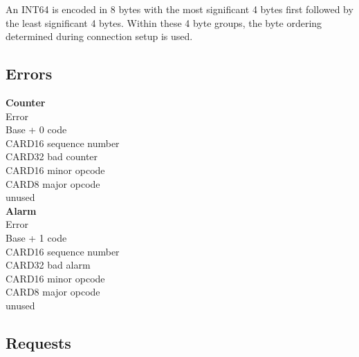 An INT64 is encoded in 8 bytes with the most significant 4 bytes
first followed by the least significant 4 bytes.  Within these
4 byte groups, the byte ordering determined during connection setup
is used.

\subsection*{Errors}

\begin{tabbing}
\tabstopsC
{\bf Counter}\\
				\> Error \\
		\> Base + 0	\> code \\
		\> CARD16	\> sequence number \\
		\> CARD32	\> bad counter \\
		\> CARD16	\> minor opcode \\
		\> CARD8	\> major opcode \\
		\>		\> unused \\
{\bf Alarm}\\
				\> Error \\
		\> Base + 1	\> code \\
		\> CARD16	\> sequence number \\
		\> CARD32	\> bad alarm \\
		\> CARD16	\> minor opcode \\
		\> CARD8	\> major opcode \\
		\>		\> unused \\
\end{tabbing}

\subsection*{Requests}

